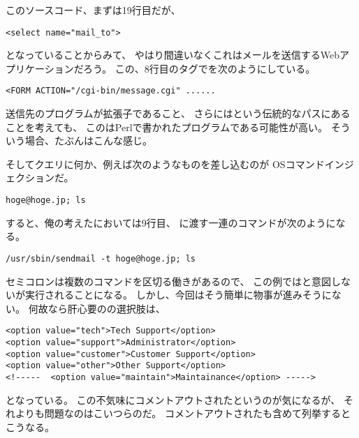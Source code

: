 

このソースコード、まずは19行目だが、

\begin{lstlisting}[style=html, firstnumber=19]
<select name="mail_to">
\end{lstlisting}

となっていることからみて、
やはり間違いなくこれはメールを送信するWebアプリケーションだろう。
この、8行目のタグでを次のようにしている。

\begin{lstlisting}[style=html, firstnumber=8]
<FORM ACTION="/cgi-bin/message.cgi" ......
\end{lstlisting}

送信先のプログラムが拡張子であること、
さらにはという伝統的なパスにあることを考えても、
このはPerlで書かれたプログラムである可能性が高い。
そういう場合、たぶんはこんな感じ。



そしてクエリに何か、例えば次のようなものを差し込むのが
OSコマンドインジェクションだ。

\begin{lstlisting}
hoge@hoge.jp; ls
\end{lstlisting}

すると、俺の考えたにおいては9行目、
に渡す一連のコマンドが次のようになる。

\begin{lstlisting}
/usr/sbin/sendmail -t hoge@hoge.jp; ls
\end{lstlisting}

セミコロンは複数のコマンドを区切る働きがあるので、
この例ではと意図しないが実行されることになる。
しかし、今回はそう簡単に物事が進みそうにない。
何故なら肝心要のの選択肢は、

\begin{lstlisting}[style=html, firstnumber=20]
<option value="tech">Tech Support</option>
<option value="support">Administrator</option>
<option value="customer">Customer Support</option>
<option value="other">Other Support</option>
<!-----  <option value="maintain">Maintainance</option> ----->
\end{lstlisting}

となっている。
この不気味にコメントアウトされたというのが気になるが、
それよりも問題なのはこいつらのだ。
コメントアウトされたも含めて列挙するとこうなる。

